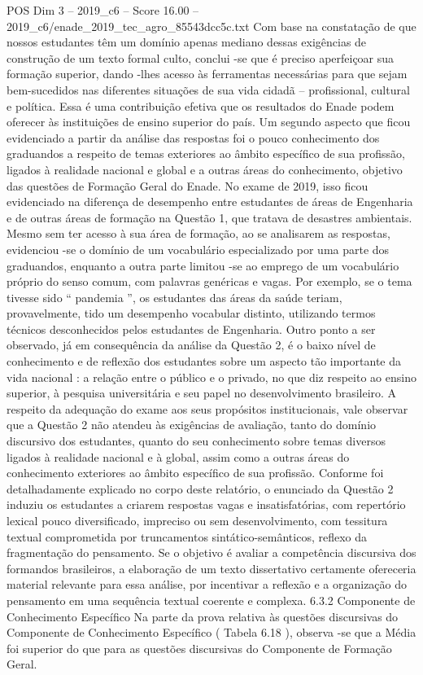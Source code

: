 \begin{textsample}{POS Dim 3 – 2019\_c6 – Score 16.00 – 2019\_c6/enade\_2019\_tec\_agro\_85543dcc5c.txt}
Com base na constatação de que nossos estudantes têm um domínio apenas mediano dessas exigências de construção de um texto formal culto, conclui -se que é preciso aperfeiçoar sua formação superior, dando -lhes acesso às ferramentas necessárias para que sejam bem-sucedidos nas diferentes situações de sua vida cidadã – profissional, cultural e política.
Essa é uma contribuição efetiva que os resultados do Enade podem oferecer às instituições de ensino superior do país.
Um segundo aspecto que ficou evidenciado a partir da análise das respostas foi o pouco conhecimento dos graduandos a respeito de temas exteriores ao âmbito específico de sua profissão, ligados à realidade nacional e global e a outras áreas do conhecimento, objetivo das questões de Formação Geral do Enade.
No exame de 2019, isso ficou evidenciado na diferença de desempenho entre estudantes de áreas de Engenharia e de outras áreas de formação na Questão 1, que tratava de desastres ambientais.
Mesmo sem ter acesso à sua área de formação, ao se analisarem as respostas, evidenciou -se o domínio de um vocabulário especializado por uma parte dos graduandos, enquanto a outra parte limitou -se ao emprego de um vocabulário próprio do senso comum, com palavras genéricas e vagas.
Por exemplo, se o tema tivesse sido “ pandemia ”, os estudantes das áreas da saúde teriam, provavelmente, tido um desempenho vocabular distinto, utilizando termos técnicos desconhecidos pelos estudantes de Engenharia.
Outro ponto a ser observado, já em consequência da análise da Questão 2, é o baixo nível de conhecimento e de reflexão dos estudantes sobre um aspecto tão importante da vida nacional : a relação entre o público e o privado, no que diz respeito ao ensino superior, à pesquisa universitária e seu papel no desenvolvimento brasileiro.
A respeito da adequação do exame aos seus propósitos institucionais, vale observar que a Questão 2 não atendeu às exigências de avaliação, tanto do domínio discursivo dos estudantes, quanto do seu conhecimento sobre temas diversos ligados à realidade nacional e à global, assim como a outras áreas do conhecimento exteriores ao âmbito específico de sua profissão.
Conforme foi detalhadamente explicado no corpo deste relatório, o enunciado da Questão 2 induziu os estudantes a criarem respostas vagas e insatisfatórias, com repertório lexical pouco diversificado, impreciso ou sem desenvolvimento, com tessitura textual comprometida por truncamentos sintático-semânticos, reflexo da fragmentação do pensamento.
Se o objetivo é avaliar a competência discursiva dos formandos brasileiros, a elaboração de um texto dissertativo certamente ofereceria material relevante para essa análise, por incentivar a reflexão e a organização do pensamento em uma sequência textual coerente e complexa. 6.3.2 Componente de Conhecimento Específico Na parte da prova relativa às questões discursivas do Componente de Conhecimento Específico ( Tabela 6.18 ), observa -se que a Média foi superior do que para as questões discursivas do Componente de Formação Geral.

\end{textsample}
